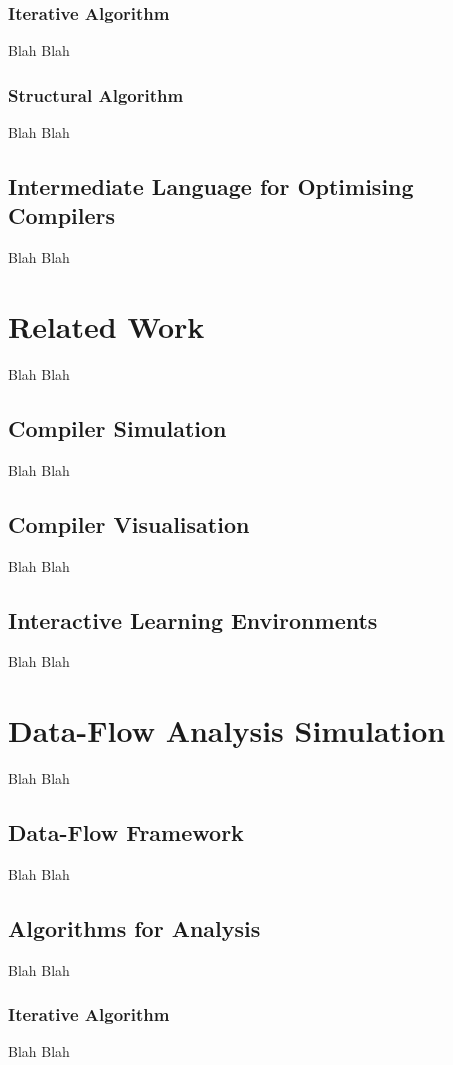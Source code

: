 \documentclass[bsc,twoside,singlespacing,parskip,logo]{infthesis}     %
\begin{document}
		\subsection{Iterative Algorithm}
		Blah Blah
    
    	\subsection{Structural Algorithm}
		Blah Blah

	\section{Intermediate Language for Optimising Compilers}
	Blah Blah


\chapter{Related Work}
Blah Blah

	\section{Compiler Simulation}
	Blah Blah

	\section{Compiler Visualisation}
	Blah Blah

	\section{Interactive Learning Environments}
	Blah Blah


\chapter{Data-Flow Analysis Simulation}
Blah Blah

	\section{Data-Flow Framework}
	Blah Blah

    \section{Algorithms for Analysis}
	Blah Blah

		\subsection{Iterative Algorithm}
		Blah Blah
    
\end{document}
